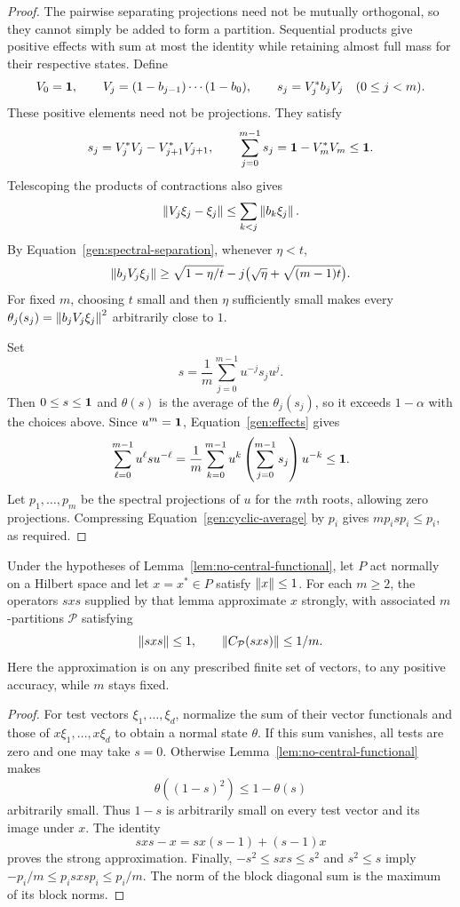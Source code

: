 \begin{proof}
The pairwise separating projections need not be mutually orthogonal,
so they cannot simply be added to form a partition. Sequential products
give positive effects with sum at most the identity while retaining
almost full mass for their respective states. Define
\[
 V_0=\mathbf 1,\qquad V_j=(1-b_{j-1})\cdots(1-b_0),\qquad
 s_j=V_j^*b_jV_j\quad(0\leq j<m).
\]
These positive elements need not be projections. They satisfy
\begin{equation}\label{gen:effects}
 s_j=V_j^*V_j-V_{j+1}^*V_{j+1},\qquad
 \sum_{j=0}^{m-1}s_j=\mathbf 1-V_m^*V_m\leq\mathbf 1.
\end{equation}
Telescoping the products of contractions also gives
\[
 \left\lVert V_j\xi_j-\xi_j\right\rVert
 \leq\sum_{k<j}\left\lVert b_k\xi_j\right\rVert.
\]
By Equation~\eqref{gen:spectral-separation}, whenever $\eta<t$,
\[
 \left\lVert b_jV_j\xi_j\right\rVert
 \geq\sqrt{1-\eta/t}
       -j\bigl(\sqrt\eta+\sqrt{(m-1)t}\bigr).
\]
For fixed $m$, choosing $t$ small and then $\eta$ sufficiently small
makes every $\theta_j(s_j)=\left\lVert b_jV_j\xi_j\right\rVert^2$ arbitrarily close
to $1$.

Set
\[
 s=\frac1m\sum_{j=0}^{m-1}u^{-j}s_ju^j.
\]
Then $0\leq s\leq\mathbf 1$ and $\theta(s)$ is the average of the
$\theta_j(s_j)$, so it exceeds $1-\alpha$ with the choices above.
Since $u^m=\mathbf 1$, Equation~\eqref{gen:effects} gives
\begin{equation}\label{gen:cyclic-average}
 \sum_{\ell=0}^{m-1}u^\ell s u^{-\ell}
 =\frac1m\sum_{k=0}^{m-1}u^k
       \left(\sum_{j=0}^{m-1}s_j\right)u^{-k}
 \leq\mathbf 1.
\end{equation}
Let $p_1,\ldots,p_m$ be the spectral projections of $u$ for the
$m$th roots, allowing zero projections. Compressing
Equation~\eqref{gen:cyclic-average} by $p_i$ gives
$mp_i s p_i\leq p_i$, as required.
\end{proof}

\begin{corollary}\label{gen:no-central-approximation}
Under the hypotheses of Lemma~\ref{lem:no-central-functional}, let
$P$ act normally on a Hilbert space and let $x=x^*\in P$ satisfy
$\left\lVert x\right\rVert\leq1$. For each $m\geq2$, the operators $sxs$ supplied
by that lemma approximate $x$ strongly, with associated
$m$-partitions $\mathcal P$ satisfying
\[
 \left\lVert sxs\right\rVert\leq1,\qquad
 \left\lVert C_{\mathcal P}(sxs)\right\rVert\leq1/m.
\]
Here the approximation is on any prescribed finite set of vectors,
to any positive accuracy, while $m$ stays fixed.
\end{corollary}

\begin{proof}
For test vectors $\xi_1,\ldots,\xi_d$, normalize the sum of their
vector functionals and those of $x\xi_1,\ldots,x\xi_d$ to obtain
a normal state $\theta$. If this sum vanishes, all tests are zero
and one may take $s=0$. Otherwise Lemma~\ref{lem:no-central-functional}
makes
\[
 \theta((1-s)^2)\leq1-\theta(s)
\]
arbitrarily small. Thus $1-s$ is arbitrarily small on every test
vector and its image under $x$. The identity
\[
 sxs-x=sx(s-1)+(s-1)x
\]
proves the strong approximation. Finally,
$-s^2\leq sxs\leq s^2$ and $s^2\leq s$ imply
$-p_i/m\leq p_i sxs p_i\leq p_i/m$. The norm of the block diagonal
sum is the maximum of its block norms.
\end{proof}

